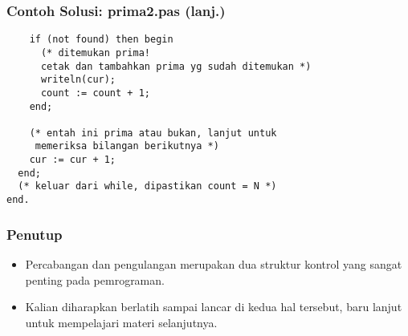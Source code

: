 \begin{frame}[fragile]
\frametitle{Contoh Solusi: prima2.pas (lanj.)}
\begin{lstlisting}
    if (not found) then begin
      (* ditemukan prima!
      cetak dan tambahkan prima yg sudah ditemukan *)
      writeln(cur);
      count := count + 1;
    end;

    (* entah ini prima atau bukan, lanjut untuk
     memeriksa bilangan berikutnya *)
    cur := cur + 1;
  end;
  (* keluar dari while, dipastikan count = N *)
end.
\end{lstlisting}
\end{frame}

\begin{frame}
\frametitle{Penutup}
\begin{itemize}
  \item Percabangan dan pengulangan merupakan dua struktur kontrol yang sangat penting pada pemrograman.
  \item Kalian diharapkan berlatih sampai lancar di kedua hal tersebut, baru lanjut untuk mempelajari materi selanjutnya.
\end{itemize}
\end{frame}


